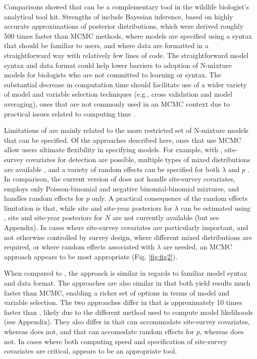 \documentclass[codesnippet]{jss}
\begin{document}
Comparisons showed that  can be a complementary tool in the 
wildlife biologist's analytical tool kit. Strengths of  include 
Bayesian inference, based on highly accurate approximations of posterior 
distributions, which were derived roughly 500 times faster than MCMC 
methods, where models are specified using a syntax that should be familiar 
to  users, and where data are formatted in a straightforward way 
with 
relatively few lines of code. The straightforward model syntax and data 
format could help lower  barriers to adoption of N-mixture models for 
biologists who are not committed to learning   or 
 syntax. The substantial decrease in computation time should 
facilitate use of a wider variety of model and variable selection techniques 
(e.g., cross validation and model averaging), ones that are not commonly 
used in an MCMC context due to practical issues related to computing time 
\citep{Kery_Schaub_2011}.

Limitations of  are mainly related to the more restricted set of 
N-mixture models that can be specified. Of the approaches described here, 
ones that use MCMC allow users ultimate flexibility in specifying models. 
For example, with , site-survey covariates for detection are 
possible, multiple types of mixed distributions are available 
\citep{Joseph_Elkin_Martin_Possingham_2009,Martin_Royle_Mackenzie_Edwards_Kery_Gardner_2011},
 and a variety of random effects can be specified for both $\lambda$ and $p$ 
\citep{Kery_Schaub_2011}. In comparison, the current version of  
does not handle site-survey covariates, employs only Poisson-binomial and 
negative binomial-binomial mixtures, and handles random effects for $p$ 
only. A practical consequence of the random effects limitation is that, 
while site and site-year posteriors for $\lambda$ can be estimated using 
, site and site-year posteriors for $N$ are not currently 
available (but see Appendix). In cases where site-survey covariates are 
particularly important, and not otherwise controlled by survey design, where 
different mixed distributions are required, or where random effects 
associated with $\lambda$ are needed, an MCMC approach appears to be most 
appropriate (Fig. \ref{fig:fig2}).

When compared to , the  approach is similar in 
regards to familiar model syntax and data format. The approaches are also 
similar in that both yield results much faster than MCMC, enabling a richer 
set of options in terms of model and variable selection. The two approaches 
differ in that  is approximately 10 times faster than 
, likely due to the different method used to compute model 
likelihoods (see Appendix). They also differ in that  can 
accommodate site-survey covariates, whereas  does not, and that 
 can accomodate random effects for $p$, whereas  
does not. In cases where both computing speed and specification of 
site-survey covariates are critical,  appears to be an 
appropriate tool.
\end{document}
